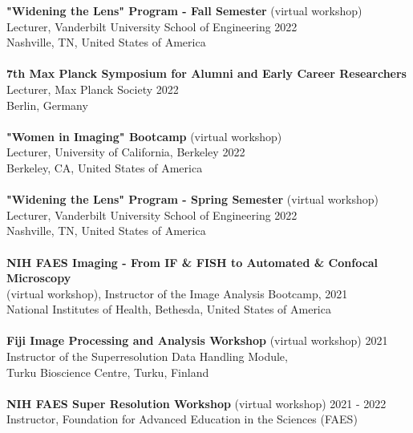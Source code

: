 \documentclass[margin,line]{res}
\begin{document}
\begin{resume}
{\bf  "Widening the Lens" Program - Fall Semester} (virtual workshop)\\ Lecturer, Vanderbilt University School of Engineering \hfill 2022\\
 Nashville, TN, United States of America\\
\vspace*{-3mm}\\
{\bf  7th Max Planck Symposium for Alumni and Early Career Researchers}\\ Lecturer, Max Planck Society \hfill 2022\\
 Berlin, Germany\\
\vspace*{-3mm}\\
{\bf  "Women in Imaging" Bootcamp} (virtual workshop)\\ Lecturer, University of California, Berkeley \hfill 2022\\
 Berkeley, CA, United States of America\\
\vspace*{-3mm}\\
{\bf  "Widening the Lens" Program - Spring Semester} (virtual workshop)\\ Lecturer, Vanderbilt University School of Engineering \hfill 2022\\
 Nashville, TN, United States of America\\
\vspace*{-3mm}\\
{\bf  NIH FAES Imaging - From IF \& FISH to Automated \& Confocal Microscopy} \\(virtual workshop), Instructor of the Image Analysis Bootcamp,  \hfill 2021\\
 National Institutes of Health, Bethesda, United States of America\\
\vspace*{-3mm}\\
{\bf  Fiji Image Processing and Analysis Workshop} (virtual workshop)  \hfill 2021\\
Instructor of the Superresolution Data Handling Module, \\Turku Bioscience Centre, Turku, Finland\\
\vspace*{-3mm}\\
{\bf  NIH FAES Super Resolution Workshop} (virtual workshop)  \hfill 2021 - 2022\\
Instructor, Foundation for Advanced Education in the Sciences (FAES)\\

\end{resume}
\end{document}
